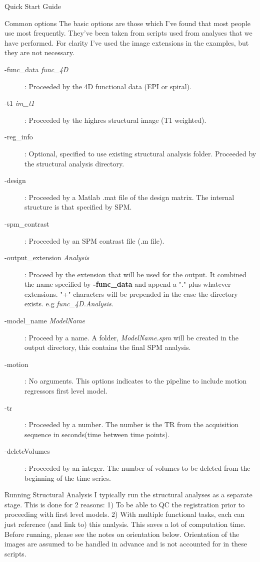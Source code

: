 \documentclass[]{report}
\begin{document}
\begin{chapter}{Quick Start Guide }

\begin{section}{Common options}
The basic options are those which I've found that most people use most frequently. They've been taken from scripts used from analyses that we have performed. For clarity I've used the image extensions in the examples, but they are not necessary.
\begin{description}
	\item [-func\_data {\it func\_4D}] :  Proceeded by the 4D functional data (EPI or spiral).
	\item [ -t1 {\it im\_t1}]  : Proceeded by the highres structural image (T1 weighted). 
	\item [-reg\_info] : Optional, specified to use existing structural analysis folder. Proceeded by the structural analysis directory.
	\item [-design] : Proceeded by a Matlab .mat file of the design matrix. The internal structure is that specified by SPM.
	\item [-spm\_contrast] : Proceeded by an SPM contrast file (.m file).
	\item [-output\_extension {\it Analysis}] : Proceed by the extension that will be used for the output. It combined the name  
						\hspace*{1cm} specified by {\bf -func\_data} and append a "." plus whatever extensions. "+"  characters will be prepended in the case 
						\hspace*{1cm} the directory exists. e.g {\it func\_4D.Analysis}.
	\item[-model\_name {\it ModelName}] : Proceed by a name. A folder, {\it ModelName.spm} will be created in the output directory, this contains the final SPM analysis.
	\item[-motion] : No arguments. This options indicates to the pipeline to include motion regressors first level model.
	\item[-tr] : Proceeded by a number. The number is the TR from the acquisition sequence in seconds(time between time points).
	\item[-deleteVolumes] : Proceeded by an integer. The number of volumes to be deleted from the beginning of the time series.
\end{description}
\end{section}
\begin{section}{Running Structural Analysis}
I typically run the structural analyses as a separate stage. This is done for 2 reasons: 1) To be able to QC the registration prior to proceeding with first level models. 2) With multiple functional tasks, each can just reference (and link to) this analysis. This saves a lot of computation time.  Before running, please see the notes on orientation below. Orientation of the images are assumed to be handled in advance and is not accounted for in these scripts.
\\


\end{section}
\end{chapter}
\end{document}
